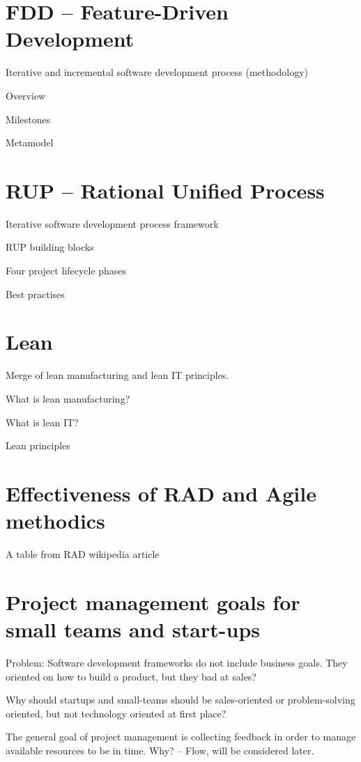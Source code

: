 \section{FDD -- Feature-Driven Development}

Iterative and incremental software development process (methodology)

Overview

Milestones

Metamodel

\section{RUP -- Rational Unified Process}

Iterative software development process framework

RUP building blocks

Four project lifecycle phases

Best practises

\section{Lean}

Merge of lean manufacturing and lean IT principles.

What is lean manufacturing?

What is lean IT?

Lean principles

\section{Effectiveness of RAD and Agile methodics}

A table from RAD wikipedia article

\section{Project management goals for small teams and start-ups}

Problem: Software development frameworks do not include business goals. They oriented on how to build a product, but they bad at sales?

Why should startups and small-teams should be sales-oriented or problem-solving oriented, but not technology oriented at first place? 

The general goal of project management is collecting feedback in order to manage available resources to be in time. Why? -- Flow, will be considered later.

